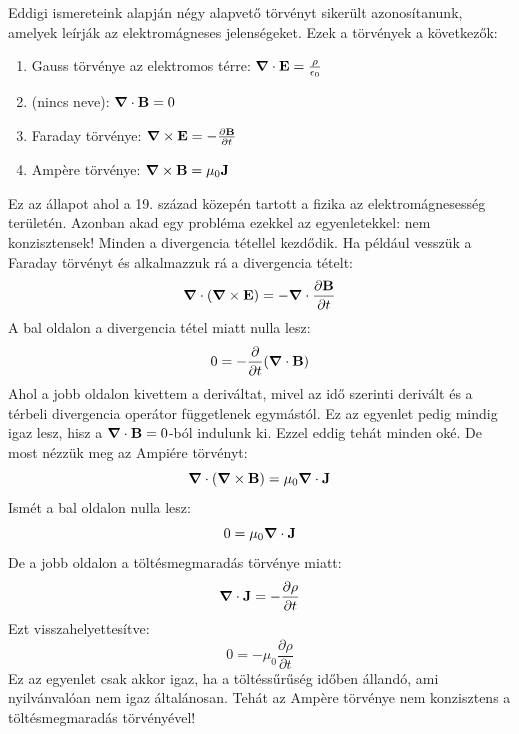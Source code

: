\documentclass[a4paper,12pt]{article}
\begin{document}
Eddigi ismereteink alapján négy alapvető törvényt sikerült azonosítanunk, amelyek leírják az elektromágneses jelenségeket. Ezek a törvények a következők:
\begin{enumerate}
    \item Gauss törvénye az elektromos térre: $\boldsymbol{\nabla} \cdot \bold{E} = \frac{\rho}{\epsilon_0}$
    \item (nincs neve): $\boldsymbol{\nabla} \cdot \bold{B} = 0$
    \item Faraday törvénye: $\boldsymbol{\nabla} \times \bold{E} = - \frac{\partial \bold{B}}{\partial t}$
    \item Ampère törvénye: $\boldsymbol{\nabla} \times \bold{B} = \mu_0 \bold{J}$
\end{enumerate}
Ez az állapot ahol a 19. század közepén tartott a fizika az elektromágnesesség területén. Azonban akad egy probléma ezekkel az egyenletekkel: nem konzisztensek!
Minden a divergencia tétellel kezdődik. Ha például vesszük a Faraday törvényt és alkalmazzuk rá a divergencia tételt:
\begin{equation}
    \boldsymbol{\nabla} \cdot (\boldsymbol{\nabla} \times \bold{E}) = - \boldsymbol{\nabla} \cdot \frac{\partial \bold{B}}{\partial t}
\end{equation}
A bal oldalon a divergencia tétel miatt nulla lesz:
\begin{equation}
    0 = - \frac{\partial }{\partial t} (\boldsymbol{\nabla} \cdot \bold{B}) 
\end{equation}
Ahol a jobb oldalon kivettem a deriváltat, mivel az idő szerinti derivált és a térbeli divergencia operátor függetlenek egymástól. Ez az egyenlet pedig mindig igaz lesz, hisz a $\boldsymbol{\nabla} \cdot \bold{B} = 0$-ból indulunk ki.
Ezzel eddig tehát minden oké. De most nézzük meg az Ampiére törvényt:
\begin{equation}
    \boldsymbol{\nabla} \cdot (\boldsymbol{\nabla} \times \bold{B}) = \mu_0 \boldsymbol{\nabla} \cdot \bold{J}
\end{equation}
Ismét a bal oldalon nulla lesz:
\begin{equation}
    0 = \mu_0 \boldsymbol{\nabla} \cdot \bold{J}
\end{equation}
De a jobb oldalon a töltésmegmaradás törvénye miatt:
\begin{equation}
    \boldsymbol{\nabla} \cdot \bold{J} = - \frac{\partial \rho}{\partial t}
\end{equation}
Ezt visszahelyettesítve:
\begin{equation}
    0 = - \mu_0 \frac{\partial \rho}{\partial t}
\end{equation}
Ez az egyenlet csak akkor igaz, ha a töltéssűrűség időben állandó, ami nyilvánvalóan nem igaz általánosan. Tehát az Ampère törvénye nem konzisztens a töltésmegmaradás törvényével!
\end{document}
